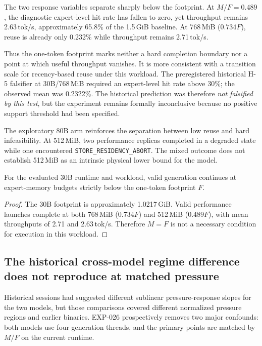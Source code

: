 The two response variables separate sharply below the footprint. At $M/F=0.489$, the diagnostic expert-level hit rate has fallen to zero, yet throughput remains 2.63\,tok/s, approximately 65.8\% of the 1.5\,GiB baseline. At 768\,MiB ($0.734F$), reuse is already only 0.232\% while throughput remains 2.71\,tok/s.

Thus the one-token footprint marks neither a hard completion boundary nor a point at which useful throughput vanishes. It is more consistent with a transition scale for recency-based reuse under this workload. The preregistered historical H-5 falsifier at 30B/768\,MiB required an expert-level hit rate above 30\%; the observed mean was 0.2322\%. The historical prediction was therefore \emph{not falsified by this test}, but the experiment remains formally inconclusive because no positive support threshold had been specified.

The exploratory 80B arm reinforces the separation between low reuse and hard infeasibility. At 512\,MiB, two performance replicas completed in a degraded state while one encountered \nolinkurl{STORE_RESIDENCY_ABORT}. The mixed outcome does not establish 512\,MiB as an intrinsic physical lower bound for the model.

\begin{proposition}
\label{prop:not-hard-threshold}
For the evaluated 30B runtime and workload, valid generation continues at expert-memory budgets strictly below the one-token footprint $F$.
\end{proposition}

\begin{proof}
The 30B footprint is approximately 1.0217\,GiB. Valid performance launches complete at both 768\,MiB ($0.734F$) and 512\,MiB ($0.489F$), with mean throughputs of 2.71 and 2.63\,tok/s. Therefore $M=F$ is not a necessary condition for execution in this workload.
\end{proof}

\subsection{The historical cross-model regime difference does not reproduce at matched pressure}

Historical sessions had suggested different sublinear pressure-response slopes for the two models, but those comparisons covered different normalized pressure regions and earlier binaries. EXP-026 prospectively removes two major confounds: both models use four generation threads, and the primary points are matched by $M/F$ on the current runtime.

